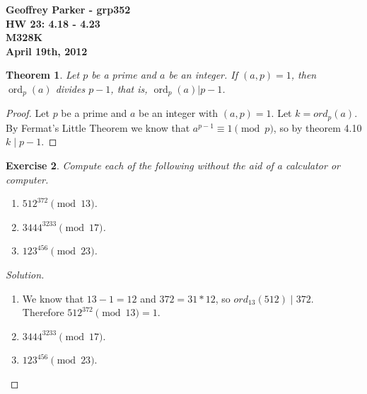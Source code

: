 \documentclass[12pt,leqno]{article}
\numberwithin{equation}{section}
\newtheorem{thm}{Theorem}[section]
\newtheorem{exer}[thm]{Exercise}
\theoremstyle{definition}
\begin{document}
\thispagestyle{plain}
\begin{flushright}
\large{\textbf{Geoffrey Parker - grp352\\
HW 23: 4.18 - 4.23\\
M328K \\
April 19th, 2012 \\}}
\end{flushright}

\markboth{}{} \setcounter{section}{0} \baselineskip=18pt

\setcounter{tocdepth}{4}



\setcounter{section}{4}

\setcounter{thm}{17}

\begin{thm}
Let $p$ be a prime and $a$ be an integer. If $(a,p)=1$, then
$\operatorname{ord}_p(a)$ divides $p-1$, that is,
$\operatorname{ord}_p(a)| p-1$.
\end{thm}
\begin{proof}[Proof]
Let $p$ be a prime and $a$ be an integer with $(a,p)=1$.  Let $k = ord_p(a)$.  By Fermat's Little Theorem we know that $a^{p-1} \equiv 1 \pmod{p}$, so by theorem 4.10 $k \mid p-1$.
\end{proof}

\begin{exer}
Compute each of the following without the aid of a calculator or
computer.
\begin{enumerate}
\item $512^{372} \pmod{13}$.
\item $3444^{3233} \pmod{17}$.
\item $123^{456} \pmod{23}$.
\end{enumerate}
\end{exer}
\begin{proof}[Solution]$ $\\
\begin{enumerate}
\item
We know that $13 - 1 = 12$ and $372 = 31 * 12$, so $ord_{13}(512) \mid 372$.\\  Therefore $512^{372} \pmod{13} = 1$.
\item
$3444^{3233} \pmod{17}$.
\item
$123^{456} \pmod{23}$.
\end{enumerate}
\end{proof}
\end{document}

